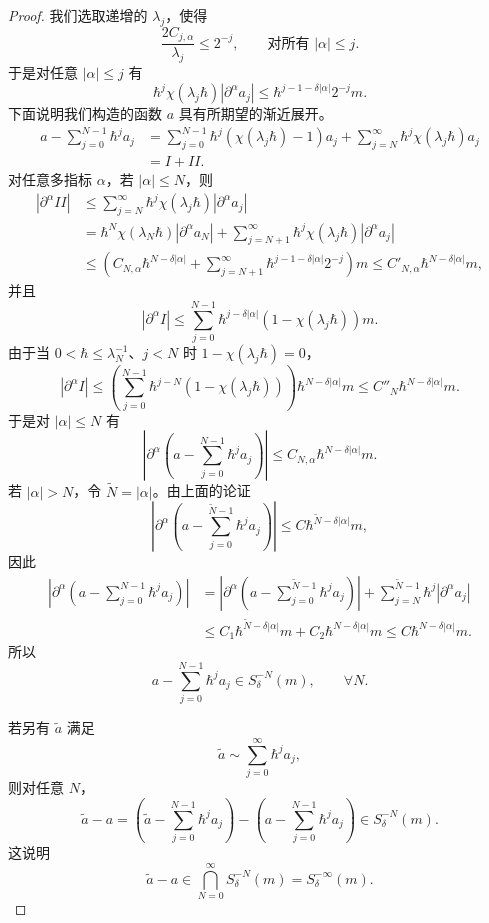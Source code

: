 \begin{proof}
  我们选取递增的 \(\lambda_j\)，使得
  \[
    \frac{2C_{j,\alpha}}{\lambda_j}\le2^{-j},
    \qquad \text{对所有 }|\alpha|\le j.
  \]
  于是对任意 \(|\alpha|\le j\) 有
  \[
    \hbar^{j}\chi(\lambda_j\hbar)\left|\partial^\alpha a_j\right|
    \le\hbar^{j-1-\delta|\alpha|}2^{-j}m.
  \]
  下面说明我们构造的函数 \(a\) 具有所期望的渐近展开。
  \begin{align*}
    a-\sum_{j=0}^{N-1}\hbar^{j}a_j
    &=\sum_{j=0}^{N-1}\hbar^{j}\left(\chi(\lambda_j\hbar)-1\right)a_j
      +\sum_{j=N}^{\infty}\hbar^{j}\chi(\lambda_j\hbar)a_j\\
    &=I+II.
  \end{align*}
  对任意多指标 \(\alpha\)，若 \(|\alpha|\le N\)，则
  \begin{align*}
    \left|\partial^\alpha II\right|
    &\le\sum_{j=N}^{\infty}\hbar^{j}\chi(\lambda_j\hbar)
      \left|\partial^\alpha a_j\right|\\
    &=\hbar^{N}\chi(\lambda_N\hbar)\left|\partial^\alpha a_N\right|
      +\sum_{j=N+1}^{\infty}\hbar^{j}\chi(\lambda_j\hbar)
      \left|\partial^\alpha a_j\right|\\
    &\le\left(C_{N,\alpha}\hbar^{N-\delta|\alpha|}
      +\sum_{j=N+1}^{\infty}\hbar^{j-1-\delta|\alpha|}2^{-j}\right)m
      \le C'_{N,\alpha}\hbar^{N-\delta|\alpha|}m,
  \end{align*}
  并且
  \[
    \left|\partial^\alpha I\right|
    \le\sum_{j=0}^{N-1}\hbar^{j-\delta|\alpha|}
    \left(1-\chi(\lambda_j\hbar)\right)m.
  \]
  由于当 \(0<\hbar\le\lambda_N^{-1}\)、\(j<N\) 时 \(1-\chi(\lambda_j\hbar)=0\)，
  \[
    \left|\partial^\alpha I\right|
    \le\left(\sum_{j=0}^{N-1}\hbar^{j-N}
      \left(1-\chi(\lambda_j\hbar)\right)\right)
    \hbar^{N-\delta|\alpha|}m
    \le C''_N\hbar^{N-\delta|\alpha|}m.
  \]
  于是对 \(|\alpha|\le N\) 有
  \[
    \left|\partial^\alpha\left(a-\sum_{j=0}^{N-1}\hbar^{j}a_j\right)\right|
    \le C_{N,\alpha}\hbar^{N-\delta|\alpha|}m.
  \]
  若 \(|\alpha|>N\)，令 \(\tilde N=|\alpha|\)。由上面的论证
  \[
    \left|\partial^\alpha\left(a-\sum_{j=0}^{\tilde N-1}\hbar^{j}a_j\right)\right|
    \le C\hbar^{\tilde N-\delta|\alpha|}m,
  \]
  因此
  \begin{align*}
    \left|\partial^\alpha\left(a-\sum_{j=0}^{N-1}\hbar^{j}a_j\right)\right|
    &=\left|\partial^\alpha\left(a-\sum_{j=0}^{\tilde N-1}\hbar^{j}a_j\right)\right|
      +\sum_{j=N}^{\tilde N-1}\hbar^{j}\left|\partial^\alpha a_j\right|\\
    &\le C_1\hbar^{\tilde N-\delta|\alpha|}m
      +C_2\hbar^{N-\delta|\alpha|}m
      \le C\hbar^{N-\delta|\alpha|}m.
  \end{align*}
  所以
  \[
    a-\sum_{j=0}^{N-1}\hbar^{j}a_j\in S_\delta^{-N}(m),
    \qquad \forall N.
  \]

  若另有 \(\tilde a\) 满足
  \[
    \tilde a\sim\sum_{j=0}^{\infty}\hbar^{j}a_j,
  \]
  则对任意 \(N\)，
  \[
    \tilde a-a
    =\left(\tilde a-\sum_{j=0}^{N-1}\hbar^{j}a_j\right)
    -\left(a-\sum_{j=0}^{N-1}\hbar^{j}a_j\right)
    \in S_\delta^{-N}(m).
  \]
  这说明
  \[
    \tilde a-a\in\bigcap_{N=0}^{\infty}S_\delta^{-N}(m)
    =S_\delta^{-\infty}(m).
  \]
\end{proof}

